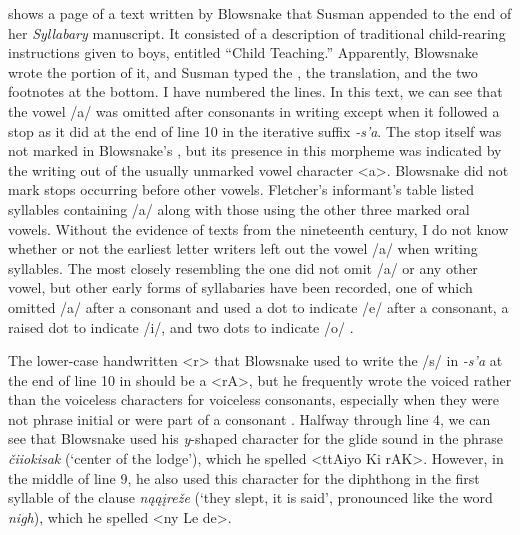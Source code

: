 \documentclass[output=paper]{LSP/langsci}
\begin{document}
 shows a page of a  text written by Blowsnake that Susman appended to the end of her \emph{ Syllabary} manuscript. It consisted of a description of traditional child-rearing instructions given to boys, entitled ``Child Teaching.'' Apparently, Blowsnake wrote the  portion of it, and Susman typed the , the  translation, and the two footnotes at the bottom. I have numbered the lines. In this text, we can see that the vowel /a/ was omitted after consonants in   writing except when it followed a  stop as it did at the end of line 10 in the iterative suffix \emph{-s'a}. The  stop itself was not marked in Blowsnake's , but its presence in this morpheme was indicated by the writing out of the usually unmarked vowel character <a>. Blowsnake did not mark  stops occurring before other vowels. Fletcher's informant's  table listed syllables containing /a/ along with those using the other three marked  oral vowels. Without the evidence of   texts from the nineteenth century, I do not know whether or not the earliest  letter writers left out the vowel /a/ when writing syllables. The   most closely resembling the  one did not omit /a/ or any other vowel, but other early forms of  syllabaries have been recorded, one of which omitted /a/ after a consonant and used a dot to indicate /e/ after a consonant, a raised dot to indicate /i/, and two dots to indicate /o/ \citep[158--159]{Walker1981}.

The lower-case handwritten <r> that Blowsnake used to write the /s/ in \emph{-s'a} at the end of line 10 in  should be a <rA>, but he frequently wrote the voiced rather than the voiceless  characters for voiceless consonants, especially when they were not phrase initial or were part of a consonant . Halfway through line 4, we can see that Blowsnake used his \emph{y}-shaped  character for the glide sound in the phrase \emph{\v{c}iiokisak} (`center of the lodge'), which he spelled <ttAiyo Ki rAK>. However, in the middle of line 9, he also used this  character for the diphthong in the first syllable of the clause \emph{n\k{a}\k{a}\k{i}re\v{z}e} (`they slept, it is said', pronounced like the  word \emph{nigh}), which he spelled <ny Le de>.  
\end{document}
